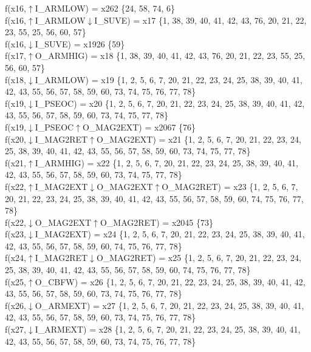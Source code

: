 f(x16,$\uparrow$I\_ARMLOW) = x262 \{24, 58, 74, 6\} \\  
f(x16,$\uparrow$I\_ARMLOW$\downarrow$I\_SUVE) = x17 \{1, 38, 39, 40, 41, 42, 43, 76, 20, 21, 22, 23, 55, 25, 56, 60, 57\} \\  
f(x16,$\downarrow$I\_SUVE) = x1926 \{59\} \\  
f(x17,$\uparrow$O\_ARMHIG) = x18 \{1, 38, 39, 40, 41, 42, 43, 76, 20, 21, 22, 23, 55, 25, 56, 60, 57\} \\  
f(x18,$\downarrow$I\_ARMLOW) = x19 \{1, 2, 5, 6, 7, 20, 21, 22, 23, 24, 25, 38, 39, 40, 41, 42, 43, 55, 56, 57, 58, 59, 60, 73, 74, 75, 76, 77, 78\} \\  
f(x19,$\downarrow$I\_PSEOC) = x20 \{1, 2, 5, 6, 7, 20, 21, 22, 23, 24, 25, 38, 39, 40, 41, 42, 43, 55, 56, 57, 58, 59, 60, 73, 74, 75, 77, 78\} \\  
f(x19,$\downarrow$I\_PSEOC$\uparrow$O\_MAG2EXT) = x2067 \{76\} \\  
f(x20,$\downarrow$I\_MAG2RET$\uparrow$O\_MAG2EXT) = x21 \{1, 2, 5, 6, 7, 20, 21, 22, 23, 24, 25, 38, 39, 40, 41, 42, 43, 55, 56, 57, 58, 59, 60, 73, 74, 75, 77, 78\} \\  
f(x21,$\uparrow$I\_ARMHIG) = x22 \{1, 2, 5, 6, 7, 20, 21, 22, 23, 24, 25, 38, 39, 40, 41, 42, 43, 55, 56, 57, 58, 59, 60, 73, 74, 75, 77, 78\} \\  
f(x22,$\uparrow$I\_MAG2EXT$\downarrow$O\_MAG2EXT$\uparrow$O\_MAG2RET) = x23 \{1, 2, 5, 6, 7, 20, 21, 22, 23, 24, 25, 38, 39, 40, 41, 42, 43, 55, 56, 57, 58, 59, 60, 74, 75, 76, 77, 78\} \\  
f(x22,$\downarrow$O\_MAG2EXT$\uparrow$O\_MAG2RET) = x2045 \{73\} \\  
f(x23,$\downarrow$I\_MAG2EXT) = x24 \{1, 2, 5, 6, 7, 20, 21, 22, 23, 24, 25, 38, 39, 40, 41, 42, 43, 55, 56, 57, 58, 59, 60, 74, 75, 76, 77, 78\} \\  
f(x24,$\uparrow$I\_MAG2RET$\downarrow$O\_MAG2RET) = x25 \{1, 2, 5, 6, 7, 20, 21, 22, 23, 24, 25, 38, 39, 40, 41, 42, 43, 55, 56, 57, 58, 59, 60, 74, 75, 76, 77, 78\} \\  
f(x25,$\uparrow$O\_CBFW) = x26 \{1, 2, 5, 6, 7, 20, 21, 22, 23, 24, 25, 38, 39, 40, 41, 42, 43, 55, 56, 57, 58, 59, 60, 73, 74, 75, 76, 77, 78\} \\  
f(x26,$\downarrow$O\_ARMEXT) = x27 \{1, 2, 5, 6, 7, 20, 21, 22, 23, 24, 25, 38, 39, 40, 41, 42, 43, 55, 56, 57, 58, 59, 60, 73, 74, 75, 76, 77, 78\} \\  
f(x27,$\downarrow$I\_ARMEXT) = x28 \{1, 2, 5, 6, 7, 20, 21, 22, 23, 24, 25, 38, 39, 40, 41, 42, 43, 55, 56, 57, 58, 59, 60, 73, 74, 75, 76, 77, 78\} \\  
